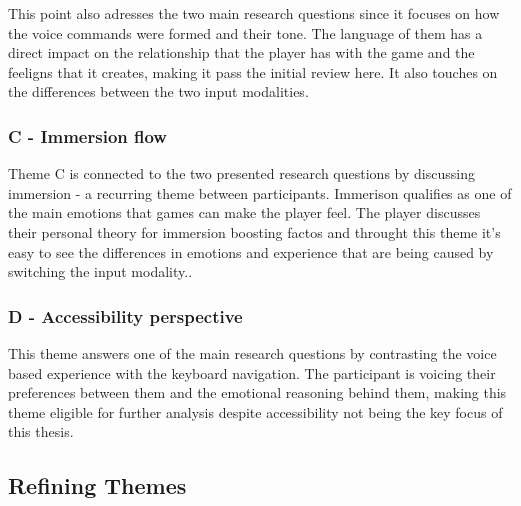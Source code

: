 This point also adresses the two main research questions since it focuses on how the voice commands were formed and their tone. The language of them has a direct impact on the relationship that the player has with the game and the feeligns that it creates, making it pass the initial review here. It also touches on the differences between the two input modalities.


\subsubsection{C - Immersion flow}


Theme C is connected to the two presented research questions by discussing immersion - a recurring theme between participants. Immerison qualifies as one of the main emotions that games can make the player feel. The player discusses their personal theory for immersion boosting factos and throught this theme it's easy to see the differences in emotions and experience that are being caused by switching the input modality..

\subsubsection{D - Accessibility perspective}


This theme answers one of the main research questions by contrasting the voice based experience with the keyboard navigation. The participant is voicing their preferences between them and the emotional reasoning behind them, making this theme eligible for further analysis despite accessibility not being the key focus of this thesis.



\subsection{Refining Themes}

